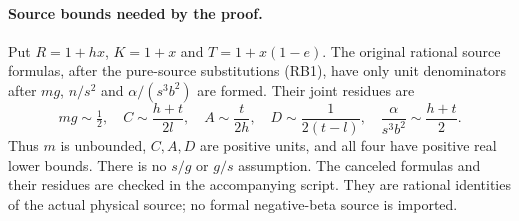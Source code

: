 \paragraph{Source bounds needed by the proof.}
Put $R=1+hx$, $K=1+x$ and $T=1+x(1-e)$. The original rational source
formulas, after the pure-source substitutions (RB1), have only unit
denominators after $mg$, $n/s^2$ and $\alpha/(s^3b^2)$ are formed.
Their joint residues are
\[
 mg\sim\tfrac12,\quad
 C\sim\frac{h+t}{2l},\quad A\sim\frac t{2h},\quad
 D\sim\frac1{2(t-l)},\quad
 \frac\alpha{s^3b^2}\sim\frac{h+t}2.               \tag{RB4}
\]
Thus $m$ is unbounded, $C,A,D$ are positive units, and all four have
positive real lower bounds. There is no $s/g$ or $g/s$ assumption.
The canceled formulas and their residues are checked in the accompanying
script. They are rational identities of the actual physical source;
no formal negative-beta source is imported.

